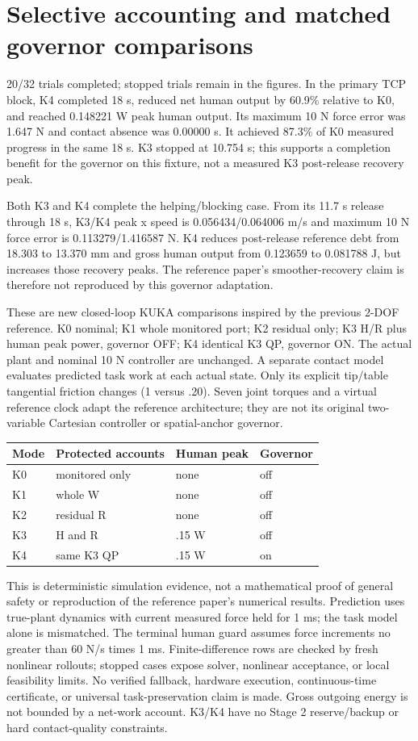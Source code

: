 \documentclass[10pt,letterpaper]{article}
\begin{document}
\section*{Selective accounting and matched governor comparisons}
20/32 trials completed; stopped trials remain in the figures. In the primary TCP block, K4 completed 18 s, reduced net human output by 60.9\% relative to K0, and reached 0.148221 W peak human output. Its maximum 10 N force error was 1.647 N and contact absence was 0.00000 s. It achieved 87.3\% of K0 measured progress in the same 18 s. K3 stopped at 10.754 s; this supports a completion benefit for the governor on this fixture, not a measured K3 post-release recovery peak.\par
Both K3 and K4 complete the helping/blocking case. From its 11.7 s release through 18 s, K3/K4 peak x speed is 0.056434/0.064006 m/s and maximum 10 N force error is 0.113279/1.416587 N. K4 reduces post-release reference debt from 18.303 to 13.370 mm and gross human output from 0.123659 to 0.081788 J, but increases those recovery peaks. The reference paper's smoother-recovery claim is therefore not reproduced by this governor adaptation.\par
These are new closed-loop KUKA comparisons inspired by the previous 2-DOF reference. K0 nominal; K1 whole monitored port; K2 residual only; K3 H/R plus human peak power, governor OFF; K4 identical K3 QP, governor ON. The actual plant and nominal 10 N controller are unchanged. A separate contact model evaluates predicted task work at each actual state. Only its explicit tip/table tangential friction changes (1 versus .20). Seven joint torques and a virtual reference clock adapt the reference architecture; they are not its original two-variable Cartesian controller or spatial-anchor governor.\par
\begin{center}\begin{tabular}{llll}\toprule Mode & Protected accounts & Human peak & Governor\\\midrule K0 & monitored only & none & off\\ K1 & whole W & none & off\\ K2 & residual R & none & off\\ K3 & H and R & .15 W & off\\ K4 & same K3 QP & .15 W & on\\\bottomrule\end{tabular}\end{center}
This is deterministic simulation evidence, not a mathematical proof of general safety or reproduction of the reference paper's numerical results. Prediction uses true-plant dynamics with current measured force held for 1 ms; the task model alone is mismatched. The terminal human guard assumes force increments no greater than 60 N/s times 1 ms. Finite-difference rows are checked by fresh nonlinear rollouts; stopped cases expose solver, nonlinear acceptance, or local feasibility limits. No verified fallback, hardware execution, continuous-time certificate, or universal task-preservation claim is made. Gross outgoing energy is not bounded by a net-work account. K3/K4 have no Stage 2 reserve/backup or hard contact-quality constraints.\par
\end{document}
